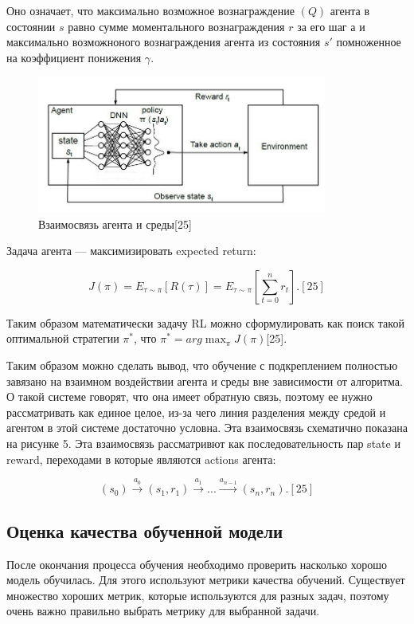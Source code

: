 \documentclass[bachelor, och, coursework]{shiza}
\begin{document}
Оно означает, что максимально возможное вознаграждение $(Q)$ агента в состоянии $s$ равно сумме моментального вознаграждения $r$ за его шаг $а$ и максимально возможноного вознаграждения агента
из состояния $s'$ помноженное на коэффициент понижения $\gamma$.

\begin{figure}[H]
    \centering
    \includegraphics[width=0.85\textwidth]{pic/7}
    \caption{Взаимосвязь агента и среды[25]}
    \label{fig:img1}
\end{figure}

Задача агента — максимизировать expected return:

\begin{equation}
    J(\pi)=E_{\tau\sim\pi}[R(\tau)]=E_{\tau\sim\pi} \left[\sum_{t=0}^n r_t\right]. [25]
\end{equation}

Таким образом математически задачу RL можно сформулировать как поиск такой оптимальной стратегии $\pi^*$, что $\pi^* = arg \mathop {max} _ \pi J(\pi)$[25].

Таким образом можно сделать вывод, что обучение с подкреплением полностью завязано на взаимном воздействии агента и среды вне зависимости от алгоритма.
О такой системе говорят, что она имеет обратную связь, поэтому ее нужно рассматривать как единое целое, из-за чего линия разделения между средой и агентом
в этой системе достаточно условна. Эта взаимосвязь схематично показана на рисунке 5. Эта взаимосвязь рассматривют как последовательность пар state и
reward, переходами в которые являются actions агента:

\begin{equation}
    (s_0) \stackrel{a_0}{\rightarrow} (s_1, r_1) \stackrel{a_1}{\rightarrow} ... \stackrel{a_{n-1}}{\rightarrow} (s_n, r_n). [25]
\end{equation}

\subsection{Оценка качества обученной модели}
После окончания процесса обучения необходимо проверить насколько хорошо модель обучилась. Для этого используют метрики качества обучений. Существует множество хороших метрик,
которые используются для разных задач, поэтому очень важно правильно выбрать метрику для выбранной задачи.
\end{document}
